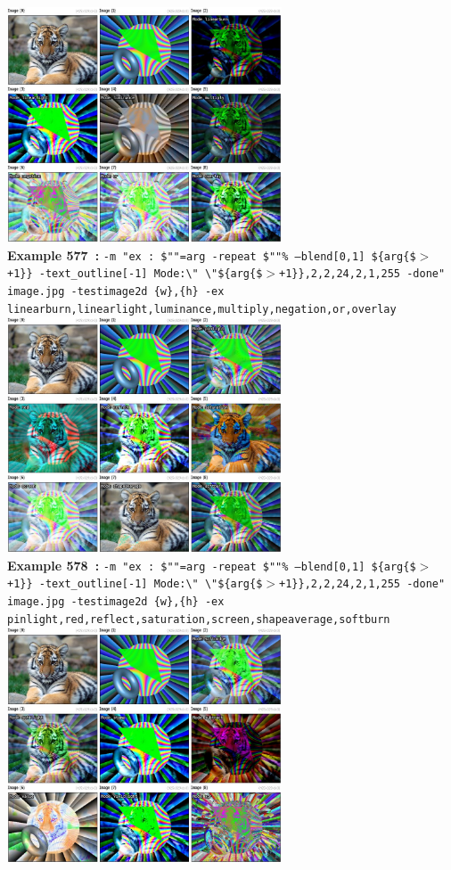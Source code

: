 \documentclass[a4paper,11pt,twoside]{book}
\begin{document}
\begin{center}
\\\includegraphics[keepaspectratio=true,height=7cm,width=\textwidth]{img/gmic_def577.jpg}\\
{\footnotesize \textbf{Example 577~:} \texttt{-m "ex : \$""=arg -repeat \$""\% --blend[0,1] \$\{arg\{\$$>$+1\}\} -text\_outline[-1] Mode:\textbackslash " \textbackslash "\$\{arg\{\$$>$+1\}\},2,2,24,2,1,255 -done" image.jpg -testimage2d \{w\},\{h\} -ex linearburn,linearlight,luminance,multiply,negation,or,overlay}}
\\\includegraphics[keepaspectratio=true,height=7cm,width=\textwidth]{img/gmic_def578.jpg}\\
{\footnotesize \textbf{Example 578~:} \texttt{-m "ex : \$""=arg -repeat \$""\% --blend[0,1] \$\{arg\{\$$>$+1\}\} -text\_outline[-1] Mode:\textbackslash " \textbackslash "\$\{arg\{\$$>$+1\}\},2,2,24,2,1,255 -done" image.jpg -testimage2d \{w\},\{h\} -ex pinlight,red,reflect,saturation,screen,shapeaverage,softburn}}
\\\includegraphics[keepaspectratio=true,height=7cm,width=\textwidth]{img/gmic_def579.jpg}\\

\end{center}
\end{document}
